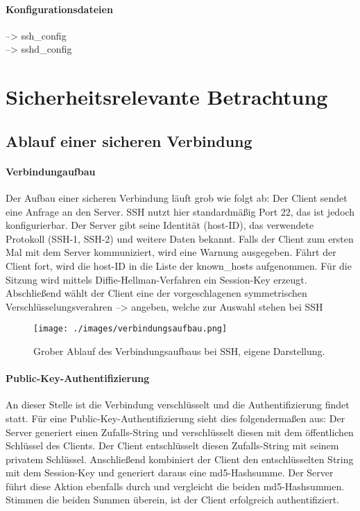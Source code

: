 \documentclass[ngerman,pdf]{wkcms}    %
\begin{document}
\paragraph{Konfigurationsdateien}

--> ssh\_config \\
--> sshd\_config \\



\section{Sicherheitsrelevante Betrachtung}


\subsection{Ablauf einer sicheren Verbindung}\label{sec:ablauf}

\paragraph{Verbindungaufbau}
Der Aufbau einer sicheren Verbindung läuft grob wie folgt ab: Der Client sendet eine Anfrage an den Server. SSH nutzt hier standardmäßig Port 22, das ist jedoch konfigurierbar. Der Server gibt seine Identität (host-ID), das verwendete Protokoll (SSH-1, SSH-2) und weitere Daten bekannt. Falls der Client zum ersten Mal mit dem Server kommuniziert, wird eine Warnung ausgegeben. Fährt der Client fort, wird die host-ID in die Liste der \IT known\_hosts aufgenommen. Für die Sitzung wird mittels Diffie-Hellman-Verfahren ein Session-Key erzeugt. Abschließend wählt der Client eine der vorgeschlagenen symmetrischen Verschlüsselungsverahren --> angeben, welche zur Auswahl stehen bei SSH

\begin{figure}[!h] 
\centering 
\texttt{[image: ./images/verbindungsaufbau.png]}
\label{fig:abb2} 
\caption[Abbildung 2]{Grober Ablauf des Verbindungsaufbaus bei SSH, eigene Darstellung.} 
\end{figure}

\paragraph{Public-Key-Authentifizierung}
An dieser Stelle ist die Verbindung verschlüsselt und die Authentifizierung findet statt. Für eine Public-Key-Authentifizierung sieht dies folgendermaßen aus: Der Server generiert einen Zufalls-String und verschlüsselt diesen mit dem öffentlichen Schlüssel des Clients. Der Client entschlüsselt diesen Zufalls-String mit seinem privatem Schlüssel. Anschließend kombiniert der Client den entschlüsselten String mit dem Session-Key und generiert daraus eine md5-Hashsumme. Der Server führt diese Aktion ebenfalls durch und vergleicht die beiden md5-Hashsummen. Stimmen die beiden Summen überein, ist der Client erfolgreich authentifiziert. \cite[S. 64]{SSH} \cite{man_ssh}
\end{document}
